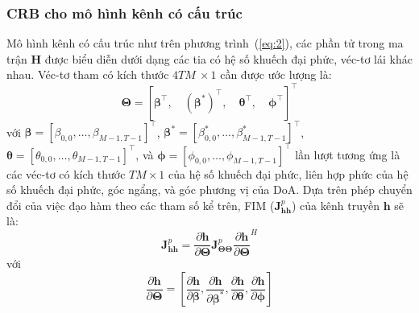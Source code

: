 \subsubsection*{\textbf{CRB cho mô hình kênh có cấu trúc}}

Mô hình kênh có cấu trúc như trên phương trình~(\ref{eq:2}), các phần tử trong ma trận $\mathbf{H}$ được biểu diễn dưới dạng các tia có hệ số khuếch đại phức, véc-tơ lái khác nhau. Véc-tơ tham có kích thước $4TM~\times 1$ cần được ước lượng là:
\begin{equation}
    \boldsymbol{\Theta}=\left[ \boldsymbol{\beta}^\top, \quad \boldsymbol{(\beta^*)}^\top, \quad \boldsymbol{\theta}^\top, \quad \boldsymbol{\phi}^\top \right]^\top
\end{equation}
với $\boldsymbol{\beta}=\left[\beta_{0,0}, \ldots, \beta_{M-1, T -1}\right]^{\top}$, $\boldsymbol{\beta^*}=\left[\beta^*_{0,0}, \ldots, \beta^*_{M-1, T - 1}\right]^{\top}$, $\boldsymbol{\theta}=\left[\theta_{0,0}, \ldots, \theta_{M-1, T - 1}\right]^{\top}$, và $\boldsymbol{\phi}=\left[\phi_{0,0}, \ldots, \phi_{M-1, T - 1}\right]^{\top}$ lần lượt tương ứng là các véc-tơ có kích thước $TM \times 1$ của hệ số khuếch đại phức, liên hợp phức của hệ số khuếch đại phức, góc ngẩng, và góc phương vị của DoA. Dựa trên phép chuyển đổi của việc đạo hàm theo các tham số kể trên, FIM ($\mathbf{J}^p_{\mathbf{h} \mathbf{h}}$) của kênh truyền $\mathbf{h}$ sẽ là:
\begin{equation}
\label{eq:13}
    \mathbf{J}^p_{\mathbf{h} \mathbf{h}}=\frac{\partial \mathbf{h}}{\partial \boldsymbol{\Theta}} \mathbf{J}^p_{\boldsymbol{\Theta} \boldsymbol{\Theta}} {\frac{\partial \mathbf{h}}{\partial \boldsymbol{\Theta}}}^{H}
\end{equation}
với 
\begin{equation}
\label{eq:2.15}
    \frac{\partial \mathbf{h}}{\partial \boldsymbol{\Theta}}=
    \left[\frac{\partial \mathbf{h}}{\partial \boldsymbol{\beta}}, 
    \frac{\partial \mathbf{h}}{\partial \boldsymbol{\beta^*}},
    \frac{\partial \mathbf{h}}{\partial \boldsymbol{\theta}}, 
    \frac{\partial \mathbf{h}}{\partial \boldsymbol{\phi}}\right]
\end{equation}
